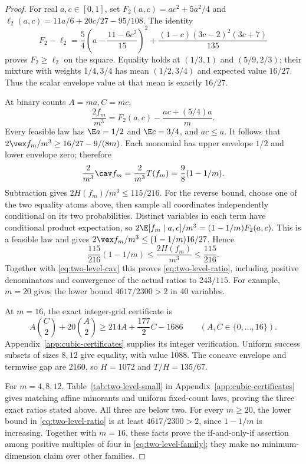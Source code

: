 \begin{proof}
For real $a,c\in[0,1]$, set $F_2(a,c)=ac^2+5a^2/4$ and
$\ell_2(a,c)=11a/6+20c/27-95/108$. The identity
\begin{equation}\label{eq:two-level-scalar}
 F_2-\ell_2=\frac54\left(a-\frac{11-6c^2}{15}\right)^2
       +\frac{(1-c)(3c-2)^2(3c+7)}{135}
\end{equation}
proves $F_2\ge\ell_2$ on the square. Equality holds at $(1/3,1)$ and
$(5/9,2/3)$; their mixture with weights $1/4,3/4$ has mean
$(1/2,3/4)$ and expected value $16/27$. Thus the scalar envelope value
at that mean is exactly $16/27$.

At binary counts $A=ma,C=mc$,
\[
 \frac{2f_m}{m^3}=F_2(a,c)-\frac{ac+(5/4)a}{m}.
\]
Every feasible law has $\E a=1/2$ and $\E c=3/4$, and $ac\le a$.
It follows that $2\vex f_m/m^3\ge16/27-9/(8m)$. Each monomial
has upper envelope $1/2$ and lower envelope zero; therefore
\begin{equation}\label{eq:two-level-cav}
 \frac{2}{m^3}\cav f_m=\frac{2}{m^3}T(f_m)=\frac98(1-1/m).
\end{equation}
Subtraction gives $2H(f_m)/m^3\le115/216$.
For the reverse bound, choose one of the two equality atoms above, then
sample all coordinates independently conditional on its two probabilities.
Distinct variables in each term have conditional product expectation,
so $2\E[f_m\mid a,c]/m^3=(1-1/m)F_2(a,c)$. This is a feasible law and
gives $2\vex f_m/m^3\le(1-1/m)16/27$. Hence
\[
 \frac{115}{216}(1-1/m)\le\frac{2H(f_m)}{m^3}\le\frac{115}{216}.
\]
Together with \eqref{eq:two-level-cav} this proves
\eqref{eq:two-level-ratio}, including positive denominators and convergence
of the actual ratios to $243/115$. For example, $m=20$ gives the lower
bound $4617/2300>2$ in 40 variables.

At $m=16$, the exact integer-grid certificate is
\begin{equation}\label{eq:two-level-16-dual}
 A\binom C2+20\binom A2\ge214A+\frac{177}{2}C-1686
 \qquad(A,C\in\{0,\ldots,16\}).
\end{equation}
Appendix~\ref{app:cubic-certificates} supplies its integer verification.
Uniform success subsets of sizes $8,12$ give equality, with value 1088.
The concave envelope and termwise gap are 2160, so $H=1072$ and
$T/H=135/67$.

For $m=4,8,12$, Table~\ref{tab:two-level-small} in
Appendix~\ref{app:cubic-certificates} gives matching affine minorants and
uniform fixed-count laws, proving the three exact ratios stated above.
All three are below two. For every $m\ge20$, the lower bound in
\eqref{eq:two-level-ratio} is at least $4617/2300>2$, since
$1-1/m$ is increasing. Together with $m=16$, these facts prove the
if-and-only-if assertion among positive multiples of four in
\eqref{eq:two-level-family}; they make no minimum-dimension claim over
other families.


\end{proof}
